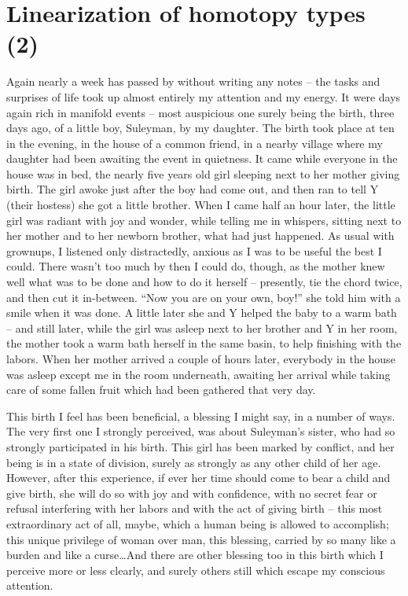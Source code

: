 
\chapter{Linearization of homotopy types (2)}
\label{ch:VII}

\noindent\hfill{}\par

\label{sec:133}%
Again nearly a week has passed by without writing any notes -- the
tasks and surprises of life took up almost entirely my attention and
my energy. It were days again rich in manifold events -- most
auspicious one surely being the birth, three days ago, of a little
boy, Suleyman, by my daughter. The birth took place at ten in the
evening, in the house of a common friend, in a nearby village where my
daughter had been awaiting the event in quietness. It came while
everyone in the house was in bed, the nearly five years old girl
sleeping next to her mother giving birth. The girl awoke just after
the boy had come out, and then ran to tell Y (their hostess) she got a
little brother. When I came half an hour later, the little girl was
radiant with joy and wonder, while telling me in whispers, sitting
next to her mother and to her newborn brother, what had just
happened. As usual with grownups, I listened only distractedly,
anxious as I was to be useful the best I could. There wasn't too much
by then I could do, though, as the mother knew well what was to be
done and how to do it herself -- presently, tie the chord twice, and
then cut it in-between. ``Now you are on your own, boy!'' she told him
with a smile when it was done. A little later she and Y helped the
baby to a warm bath -- and still later, while the girl was asleep next
to her brother and Y in her room, the mother took a warm bath herself
in the same basin, to help finishing with the labors. When her mother
arrived a couple of hours later, everybody in the house was asleep
except me in the room underneath, awaiting her arrival while taking
care of some fallen fruit which had been gathered that very day.

This birth I feel has been beneficial, a blessing I might say, in a
number of ways. The very first one I strongly perceived, was about
Suleyman's sister, who had so strongly participated in his birth. This
girl has been marked by conflict, and her being is in a state of
division, surely as strongly as any other child of her age. However,
after this experience, if ever her time should come to bear a child
and give birth, she will do so with joy and with confidence, with no
secret fear or refusal interfering with her labors and with the act of
giving birth -- this most extraordinary act of all, maybe, which a
human being is allowed to accomplish; this unique privilege of woman
over man, this blessing, carried by so many like a burden and like a
curse\dots\enspace And there are other blessing too in this birth
which I perceive more or less clearly, and surely others still which
escape my conscious attention.


